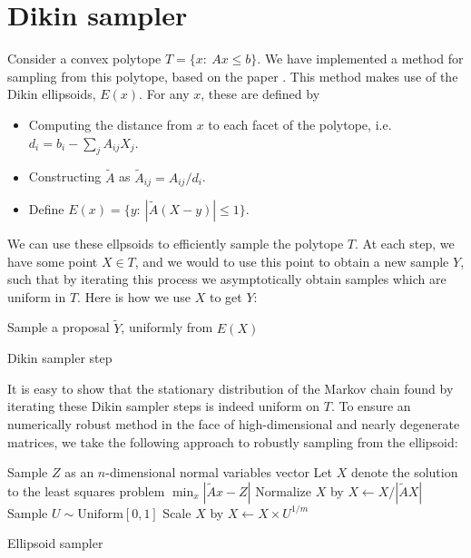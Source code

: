 


\appendix

\section{Dikin sampler}

\label{sec:dikin}

Consider a convex polytope $T=\{x:\ Ax\leq b\}$.  We have implemented a method for sampling from this polytope, based on the paper \citep{kannan2012random}.  This method makes use of the Dikin ellipsoids, $E(x)$.  For any $x$, these are defined by 

\begin{itemize}
    \item Computing the distance from $x$ to each facet of the polytope, i.e. $d_i = b_i - \sum_j A_{ij} X_j$.
    \item Constructing $\tilde A$ as $\tilde A_{ij} = A_{ij} / d_i$.
    \item Define $E(x) = \{y:\ |\tilde A (X-y)|\leq 1\}$.  
\end{itemize}

We can use these ellpsoids to efficiently sample the polytope $T$.    At each step, we have some point $X\in T$, and we would to use this point to obtain a new sample $Y$, such that by iterating this process we asymptotically obtain samples which are uniform in $T$.  Here is how we use $X$ to get $Y$:

\begin{algorithm}[H]
 \vspace{.1in}
  Sample a proposal $\tilde Y$, uniformly from $E(X)$\;
 \caption{Dikin sampler step}
\end{algorithm}

It is easy to show that the stationary distribution of the Markov chain found by iterating these Dikin sampler steps is indeed uniform on $T$.  To ensure an numerically robust method in the face of high-dimensional and nearly degenerate matrices, we take the following approach to robustly sampling from the ellipsoid:

\begin{algorithm}[H]
 \vspace{.1in}
  Sample $Z$ as an $n$-dimensional normal variables vector\;
  Let $X$ denote the solution to the least squares problem $\min_x|\tilde Ax - Z|$\;
  Normalize $X$ by $X \gets X/|\tilde AX|$\;
  Sample $U \sim \mathrm{Uniform}[0,1]$\;
  Scale $X$ by $X \gets X \times U^{1/m}$\;
 \caption{Ellipsoid sampler}
\end{algorithm}


